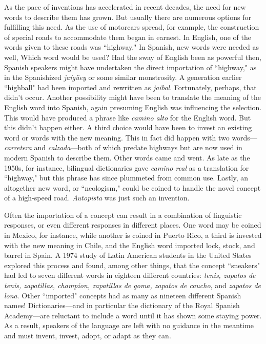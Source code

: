 As the pace of inventions has accelerated in recent decades,
the need for new words to describe them has grown. But usually there
are numerous options for fulfilling this need. As the use of motorcars
spread, for example, the construction of special roads to accommodate
them began in earnest. In English, one of the words given to these roads
was ``highway." In Spanish, new words were needed as well, Which
word would be used? Had the sway of English been as powerful then,
Spanish speakers might have undertaken the direct importation of
``highway," as in the Spanishized \emph{jaígüey} or some similar monstrosity. A generation earlier ``highball" had been imported and rewritten
as \emph{jaibol}. Fortunately, perhaps, that didn't occur. Another possibility
might have been to translate the meaning of the English word into
Spanish, again presuming English was influencing the selection. This
would have produced a phrase like \emph{camino alto} for the English word.
But this didn't happen either. A third choice would have been to invest
an existing word or words with the new meaning. This in fact did happen with two words---\emph{carretera} and \emph{calzada}---both of which predate
highways but are now used in modern Spanish to describe them. Other
words came and went. As late as the 1950s, for instance, bilingual
dictionaries gave \emph{camino real} as a translation for ``highway," but this
phrase has since plummeted from common use. Lastly, an altogether
new word, or ``neologism," could be coined to handle the novel concept of a high-speed road. \emph{Autopista} was just such an invention.

Often the importation of a concept can result in a combination
of linguistic responses, or even different responses in different places.
One word may be coined in Mexico, for instance, while another is
coined in Puerto Rico, a third is invested with the new meaning in
Chile, and the English word imported lock, stock, and barrel in Spain.
A 1974 study of Latin American students in the United States explored
this process and found, among other things, that the concept ``sneakers" had led to seven different words in eighteen different countries:
\emph{tenis, zapatos de tenis, zapatillas, champion, zapatillas de goma, zapatos de caucho}, and \emph{zapatos de lona}. Other ``imported" concepts had
as many as nineteen different Spanish names! Dictionaries---and in
particular the dictionary of the Royal Spanish Academy---are reluctant
to include a word until it has shown some staying power. As a result,
speakers of the language are left with no guidance in the meantime and
must invent, invest, adopt, or adapt as they can.

